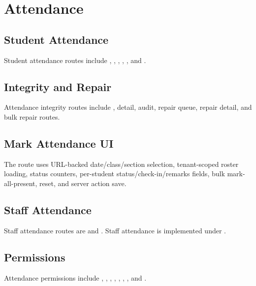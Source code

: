 \chapter{Attendance}
\section{Student Attendance}
Student attendance routes include , , , , , and .

\section{Integrity and Repair}
Attendance integrity routes include , detail, audit, repair queue, repair detail, and bulk repair routes.

\section{Mark Attendance UI}
The  route uses URL-backed date/class/section selection, tenant-scoped roster loading, status counters, per-student status/check-in/remarks fields, bulk mark-all-present, reset, and server action save.

\section{Staff Attendance}
Staff attendance routes are  and . Staff attendance is implemented under .

\section{Permissions}
Attendance permissions include , , , , , , , and .
